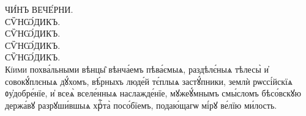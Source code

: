 \documentclass{article}
\begin{document}
{\fontsize{64pt}{2em} \simple ЧИ́НЪ ВЕЧЕ́РНИ.} \\

{\fontsize{64pt}{2em} \glyphfont СѶНѠ́ДИКЪ.} \\

{\fontsize{64pt}{2em} \simple СѶНѠ́ДИКЪ.} \\

{\fontsize{64pt}{2em} \simple\salt СѶНѠ́ДИКЪ.} \\

{\fontsize{64pt}{2em} \simple\salta СѶНѠ́ДИКЪ.} \\

{\slv \large \lettrine{\fontsize{48pt}{2em} \glyphfont К}{і́ими} похва́льными вѣнцы̑ вѣнча́емъ пѣва́ємыѧ, раздѣлє́ныѧ тѣлесы̀ и҆ совокꙋ́плєныѧ дꙋ́хомъ, вѣ́рныхъ люде́й тє́плыѧ застꙋ́пники, землѝ рѡссі́йскїѧ ᲂу҆добре́нїе, и҆ всеѧ̀ вселе́нныѧ наслажде́нїе, мꙋжеꙋ́мнымъ смы́сломъ бѣсо́вскꙋю держа́вꙋ разрꙋши́вшыѧ хрⷭ҇та̀ посо́бїемъ, подаю́щагѡ мі́рꙋ ве́лїю ми́лость. }
\end{document}
